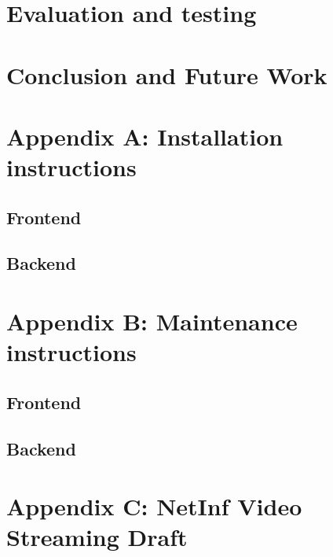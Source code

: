 \documentclass[11pt]{report}
\begin{document}








\chapter{Evaluation and testing}



\chapter{Conclusion and Future Work}


\chapter{Appendix A: Installation instructions}
\section {Frontend}

\section {Backend}

\chapter {Appendix B: Maintenance instructions}

\section{Frontend}

\section{Backend}

\chapter {Appendix C: NetInf Video Streaming Draft}

\end{document}
